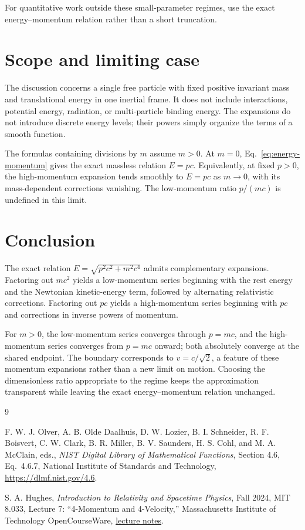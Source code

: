\documentclass[12pt]{article}
\begin{document}
For quantitative work outside these small-parameter regimes, use the exact energy--momentum relation rather than a short truncation.

\section{Scope and limiting case}

The discussion concerns a single free particle with fixed positive invariant mass and translational energy in one inertial frame. It does not include interactions, potential energy, radiation, or multi-particle binding energy. The expansions do not introduce discrete energy levels; their powers simply organize the terms of a smooth function.

The formulas containing divisions by $m$ assume $m>0$. At $m=0$, Eq.~\eqref{eq:energy-momentum} gives the exact massless relation $E=pc$. Equivalently, at fixed $p>0$, the high-momentum expansion tends smoothly to $E=pc$ as $m\to0$, with its mass-dependent corrections vanishing. The low-momentum ratio $p/(mc)$ is undefined in this limit.

\section{Conclusion}

The exact relation $E=\sqrt{p^2c^2+m^2c^4}$ admits complementary expansions. Factoring out $mc^2$ yields a low-momentum series beginning with the rest energy and the Newtonian kinetic-energy term, followed by alternating relativistic corrections. Factoring out $pc$ yields a high-momentum series beginning with $pc$ and corrections in inverse powers of momentum.

For $m>0$, the low-momentum series converges through $p=mc$, and the high-momentum series converges from $p=mc$ onward; both absolutely converge at the shared endpoint. The boundary corresponds to $v=c/\sqrt{2}$, a feature of these momentum expansions rather than a new limit on motion. Choosing the dimensionless ratio appropriate to the regime keeps the approximation transparent while leaving the exact energy--momentum relation unchanged.

\begin{thebibliography}{9}
\small
{}
\raggedright
{}

F. W. J. Olver, A. B. Olde Daalhuis, D. W. Lozier, B. I. Schneider, R. F. Boisvert, C. W. Clark, B. R. Miller, B. V. Saunders, H. S. Cohl, and M. A. McClain, eds.,
\emph{NIST Digital Library of Mathematical Functions}, Section 4.6, Eq.~4.6.7, National Institute of Standards and Technology,
\url{https://dlmf.nist.gov/4.6}.

S. A. Hughes,
\emph{Introduction to Relativity and Spacetime Physics}, Fall 2024, MIT 8.033, Lecture 7: ``4-Momentum and 4-Velocity,'' Massachusetts Institute of Technology OpenCourseWare,
\href{https://ocw.mit.edu/courses/8-033-introduction-to-relativity-and-spacetime-physics-fall-2024/pages/lecture-notes/}{lecture notes}.

\end{thebibliography}
\end{document}
